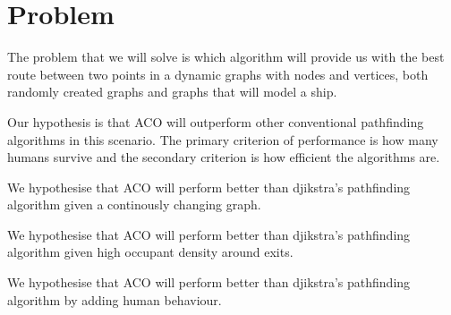 \chapter{Problem}
\label{ch:problem}


The problem that we will solve is which algorithm will provide us with the best route between 
two points in a dynamic graphs with nodes and vertices, both randomly created graphs and 
graphs that will model a ship.

Our hypothesis is that ACO will outperform other conventional pathfinding algorithms
in this scenario. The primary criterion of performance is how many humans survive and
the secondary criterion is how efficient the algorithms are.

We hypothesise that ACO will perform better than djikstra's pathfinding algorithm
given a continously changing graph.

We hypothesise that ACO will perform better than djikstra's pathfinding algorithm
given high occupant density around exits.

We hypothesise that ACO will perform better than djikstra's pathfinding algorithm
by adding human behaviour.

